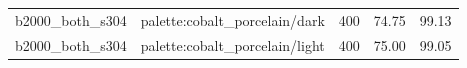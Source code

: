 \begin{longtable}{l>{\raggedright\arraybackslash}p{.42\linewidth}rrr}
b2000\_\allowbreak{}both\_\allowbreak{}s304 & %
palette:cobalt\_\allowbreak{}porcelain/dark & %
400 & %
74.75 & %
99.13 \\ %

b2000\_\allowbreak{}both\_\allowbreak{}s304 & %
palette:cobalt\_\allowbreak{}porcelain/light & %
400 & %
75.00 & %
99.05 \\ %


\end{longtable}
